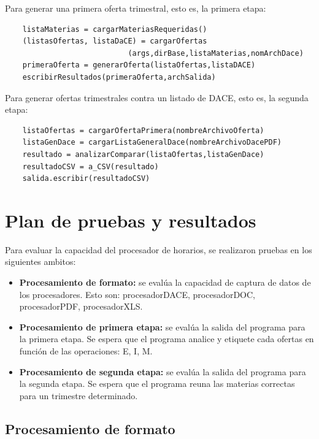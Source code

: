 \documentclass[]{article}
\begin{document}
Para generar una primera oferta trimestral, esto es, la primera etapa:

\begin{verbatim}
    listaMaterias = cargarMateriasRequeridas()
    (listasOfertas, listaDaCE) = cargarOfertas
                            (args,dirBase,listaMaterias,nomArchDace)
    primeraOferta = generarOferta(listaOfertas,listaDACE)
    escribirResultados(primeraOferta,archSalida)
\end{verbatim}

Para generar ofertas trimestrales contra un listado de DACE, esto es, la
segunda etapa:

\begin{verbatim}
    listaOfertas = cargarOfertaPrimera(nombreArchivoOferta)
    listaGenDace = cargarListaGeneralDace(nombreArchivoDacePDF)
    resultado = analizarComparar(listaOfertas,listaGenDace)
    resultadoCSV = a_CSV(resultado)
    salida.escribir(resultadoCSV)
\end{verbatim}

\section{Plan de pruebas y
resultados}\label{plan-de-pruebas-y-resultados}

Para evaluar la capacidad del procesador de horarios, se realizaron
pruebas en los siguientes ambitos:

\begin{itemize}
\item
  \textbf{Procesamiento de formato:} se evalúa la capacidad de captura
  de datos de los procesadores. Esto son: procesadorDACE, procesadorDOC,
  procesadorPDF, procesadorXLS.
\item
  \textbf{Procesamiento de primera etapa:} se evalúa la salida del
  programa para la primera etapa. Se espera que el programa analice y
  etiquete cada ofertas en función de las operaciones: E, I, M.
\item
  \textbf{Procesamiento de segunda etapa:} se evalúa la salida del
  programa para la segunda etapa. Se espera que el programa reuna las
  materias correctas para un trimestre determinado.
\end{itemize}

\subsection{Procesamiento de formato}\label{procesamiento-de-formato}
\end{document}
